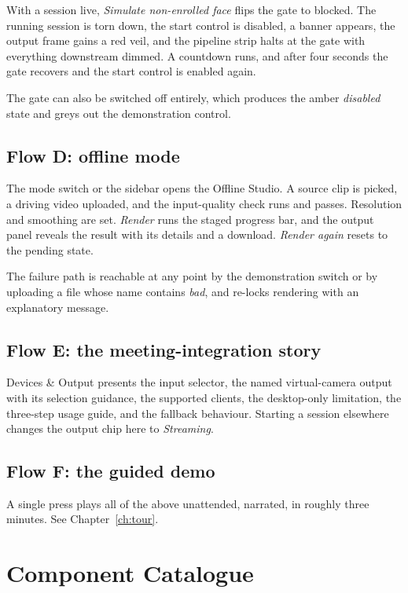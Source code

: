 \documentclass[11pt,a4paper]{report}
\begin{document}
With a session live, \emph{Simulate non-enrolled face} flips the gate to
blocked. The running session is torn down, the start control is disabled, a
banner appears, the output frame gains a red veil, and the pipeline strip halts
at the gate with everything downstream dimmed. A countdown runs, and after four
seconds the gate recovers and the start control is enabled again.

The gate can also be switched off entirely, which produces the amber
\emph{disabled} state and greys out the demonstration control.

\section{Flow D: offline mode}

The mode switch or the sidebar opens the Offline Studio. A source clip is
picked, a driving video uploaded, and the input-quality check runs and passes.
Resolution and smoothing are set. \emph{Render} runs the staged progress bar,
and the output panel reveals the result with its details and a download.
\emph{Render again} resets to the pending state.

The failure path is reachable at any point by the demonstration switch or by
uploading a file whose name contains \emph{bad}, and re-locks rendering with an
explanatory message.

\section{Flow E: the meeting-integration story}

Devices \& Output presents the input selector, the named virtual-camera output
with its selection guidance, the supported clients, the desktop-only
limitation, the three-step usage guide, and the fallback behaviour. Starting a
session elsewhere changes the output chip here to \emph{Streaming}.

\section{Flow F: the guided demo}

A single press plays all of the above unattended, narrated, in roughly three
minutes. See Chapter~\ref{ch:tour}.

\chapter{Component Catalogue}
\end{document}
